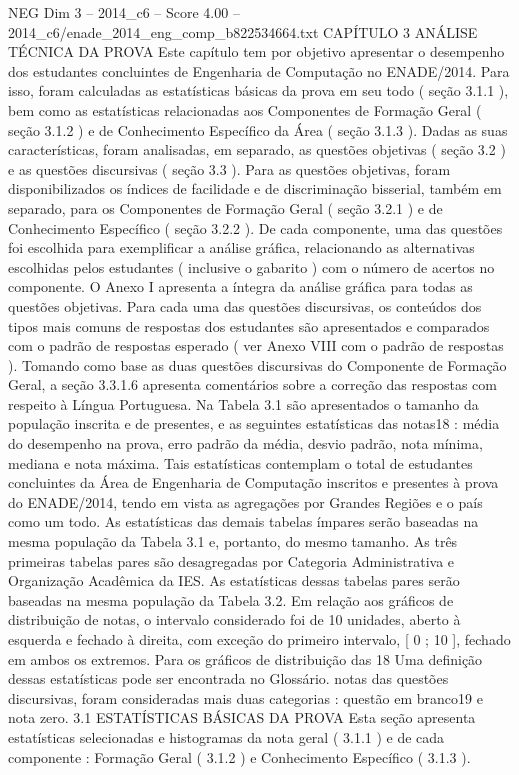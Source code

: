 \begin{textsample}{NEG Dim 3 – 2014\_c6 – Score 4.00 – 2014\_c6/enade\_2014\_eng\_comp\_b822534664.txt}  \label{ex:f3_neg_245}
CAPÍTULO 3 ANÁLISE TÉCNICA DA PROVA Este capítulo tem por objetivo apresentar o desempenho dos estudantes concluintes de Engenharia de Computação no ENADE/2014.
Para isso, foram calculadas as estatísticas básicas da prova em seu todo ( seção 3.1.1 ), bem como as estatísticas relacionadas aos Componentes de Formação Geral ( seção 3.1.2 ) e de Conhecimento Específico da Área ( seção 3.1.3 ).
Dadas as suas características, foram analisadas, em separado, as questões objetivas ( seção 3.2 ) e as questões discursivas ( seção 3.3 ).
Para as questões objetivas, foram disponibilizados os índices de facilidade e de discriminação bisserial, também em separado, para os Componentes de Formação Geral ( seção 3.2.1 ) e de Conhecimento Específico ( seção 3.2.2 ).
De cada componente, uma das questões foi escolhida para exemplificar a análise gráfica, relacionando as alternativas escolhidas pelos estudantes ( inclusive o gabarito ) com o número de acertos no componente.
O Anexo I apresenta a íntegra da análise gráfica para todas as questões objetivas.
Para cada uma das questões discursivas, os conteúdos dos tipos mais comuns de respostas dos estudantes são apresentados e comparados com o padrão de respostas esperado ( ver Anexo VIII com o padrão de respostas ).
Tomando como base as duas questões discursivas do Componente de Formação Geral, a seção 3.3.1.6 apresenta comentários sobre a correção das respostas com respeito à Língua Portuguesa.
Na Tabela 3.1 são apresentados o tamanho da população inscrita e de presentes, e as seguintes estatísticas das notas18 : média do desempenho na prova, erro padrão da média, desvio padrão, nota mínima, mediana e nota máxima.
Tais estatísticas contemplam o total de estudantes concluintes da Área de Engenharia de Computação inscritos e presentes à prova do ENADE/2014, tendo em vista as agregações por Grandes Regiões e o país como um todo.
As estatísticas das demais tabelas ímpares serão baseadas na mesma população da Tabela 3.1 e, portanto, do mesmo tamanho.
As três primeiras tabelas pares são desagregadas por Categoria Administrativa e Organização Acadêmica da IES.
As estatísticas dessas tabelas pares serão baseadas na mesma população da Tabela 3.2.
Em relação aos gráficos de distribuição de notas, o intervalo considerado foi de 10 unidades, aberto à esquerda e fechado à direita, com exceção do primeiro intervalo, [ 0 ; 10 ], fechado em ambos os extremos.
Para os gráficos de distribuição das 18 Uma definição dessas estatísticas pode ser encontrada no Glossário. notas das questões discursivas, foram consideradas mais duas categorias : questão em branco19 e nota zero. 3.1 ESTATÍSTICAS BÁSICAS DA PROVA Esta seção apresenta estatísticas selecionadas e histogramas da nota geral ( 3.1.1 ) e de cada componente : Formação Geral ( 3.1.2 ) e Conhecimento Específico ( 3.1.3 ).

\end{textsample}
